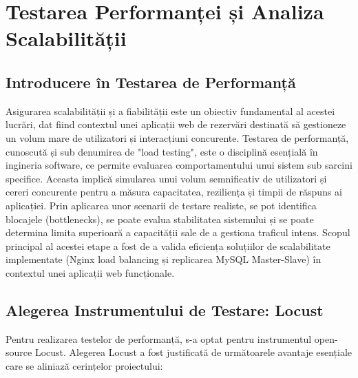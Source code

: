 \documentclass[12pt, a4paper, oneside, romanian]{teza-upb}
\begin{document}
\chapter{Testarea Performanței și Analiza Scalabilității}

\section{Introducere în Testarea de Performanță}
Asigurarea scalabilității și a fiabilității este un obiectiv fundamental al acestei lucrări, dat fiind contextul unei aplicații web de rezervări destinată să gestioneze un volum mare de utilizatori și interacțiuni concurente. Testarea de performanță, cunoscută și sub denumirea de "load testing", este o disciplină esențială în ingineria software, ce permite evaluarea comportamentului unui sistem sub sarcini specifice. Aceasta implică simularea unui volum semnificativ de utilizatori și cereri concurente pentru a măsura capacitatea, reziliența și timpii de răspuns ai aplicației. Prin aplicarea unor scenarii de testare realiste, se pot identifica blocajele (bottlenecks), se poate evalua stabilitatea sistemului și se poate determina limita superioară a capacității sale de a gestiona traficul intens. Scopul principal al acestei etape a fost de a valida eficiența soluțiilor de scalabilitate implementate (Nginx load balancing și replicarea MySQL Master-Slave) în contextul unei aplicații web funcționale.

\section{Alegerea Instrumentului de Testare: Locust}
Pentru realizarea testelor de performanță, s-a optat pentru instrumentul open-source Locust. Alegerea Locust a fost justificată de următoarele avantaje esențiale care se aliniază cerințelor proiectului:
\end{document}
